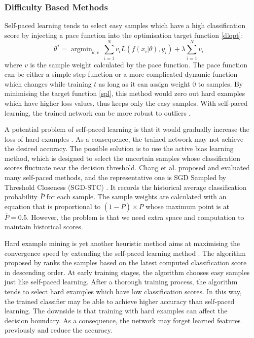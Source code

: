 \subsubsection{Difficulty Based Methods}

Self-paced learning tends to select easy samples which have a high classification score by injecting a pace function into the optimisation target function \ref{dlopt}:
\begin{equation}
\label{spl}
\theta^* = \mathop{\arg\min}_{\theta, v}\ \sum^{N}_{i=1} v_iL(f(x_i|\theta), y_i) + \lambda \sum^{N}_{i=1}  v_i
\end{equation}
where $v$ is the sample weight calculated by the pace function. The pace function can be either a simple step function \cite{Kumar2010} or a more complicated dynamic function which changes while training $t$ \cite{Li2017} as long as it can assign weight 0 to samples. By minimising the target function \ref{spl}, this method would zero out hard examples which have higher loss values, thus keeps only the easy samples. With self-paced learning, the trained network can be more robust to outliers \cite{Meng2016}.

A potential problem of self-paced learning is that it would gradually increase the loss of hard examples \cite{Kumar2010}. As a consequence, the trained network may not achieve the desired accuracy. The possible solution is to use the active bias learning method, which is designed to select the uncertain samples whose classification scores fluctuate near the decision threshold. Chang et al. proposed and evaluated many self-paced methods, and the representative one is  SGD Sampled by Threshold Closeness (SGD-STC) \cite{Chang2017}. It records the historical average classification probability $\bar{P}$ for each sample. The sample weights are calculated with an equation that is proportional to $(1-\bar{P}) \times \bar{P}$ whose maximum point is at $\bar{P} = 0.5$. However, the problem is that we need extra space and computation to maintain historical scores.

Hard example mining is yet another heuristic method aims at maximising the convergence speed by extending the self-paced learning method \cite{Shrivastava2016}. The algorithm proposed by \cite{Loshchilov2015} ranks the samples based on the latest computed classification score in descending order. At early training stages, the algorithm chooses easy samples just like self-paced learning. After a thorough training process, the algorithm tends to select hard examples which have low classification scores. In this way, the trained classifier may be able to achieve higher accuracy than self-paced learning. The downside is that training with hard examples can affect the decision boundary. As a consequence, the network may forget learned features previously and reduce the accuracy. 



